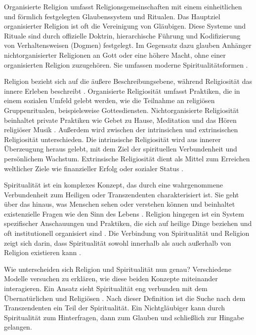 Organisierte Religion umfasst Religionsgemeinschaften mit einem einheitlichen und förmlich festgelegten Glaubenssystem und Ritualen. Das Hauptziel organisierter Religion ist oft die Vereinigung von Gläubigen. Diese Systeme und Rituale sind durch offizielle Doktrin, hierarchische Führung und Kodifizierung von Verhaltensweisen (Dogmen) festgelegt. 
Im Gegensatz dazu glauben Anhänger nichtorganisierter Religionen an Gott oder eine höhere Macht, ohne einer organisierten Religion zuzugehören. Sie umfassen moderne Spiritualitätsformen \parencite{OrgaRel}.

Religion bezieht sich auf die äußere Beschreibungsebene, während Religiosität das innere Erleben beschreibt \parencite{ReligionReligiosität}. Organisierte Religiosität umfasst Praktiken, die in einem sozialen Umfeld gelebt werden, wie die Teilnahme an religiösen Gruppenritualen, beispielsweise Gottesdiensten. Nichtorganisierte Religiosität beinhaltet private Praktiken wie Gebet zu Hause, Meditation und das Hören religiöser Musik \parencite{ReliSpiriModell, DUREL_Val}. 
Außerdem wird zwischen der intrinsichen und extrinsischen Religiosität unterschieden. Die intrinsische Religiosität wird aus innerer Überzeugung heraus gelebt, mit dem Ziel der spirituellen Verbundenheit und persönlichem Wachstum. Extrinsische Religiosität dient als Mittel zum Erreichen weltlicher Ziele wie finanzieller Erfolg oder sozialer Status \parencite{DUREL_Val}.

Spiritualität ist ein komplexes Konzept, das durch eine wahrgenommene Verbundenheit zum Heiligen oder Transzendenten charakterisiert ist. Sie geht über das hinaus, was Menschen sehen oder verstehen können und beinhaltet existenzielle Fragen wie den Sinn des Lebens \parencite{Spiritualität}. Religion hingegen ist ein System spezifischer Anschauungen und Praktiken, die sich auf heilige Dinge beziehen und oft institutionell organisiert sind \parencite{Durkeim1981}. Die Verbindung von Spiritualität und Religion zeigt sich darin, dass Spiritualität sowohl innerhalb als auch außerhalb von Religion existieren kann \parencite{Büssing2008}.

Wie unterscheiden sich Religion und Spiritualität nun genau? Verschiedene Modelle versuchen zu erklären, wie diese beiden Konzepte miteinander interagieren. Ein Ansatz sieht Spiritualität eng verbunden mit dem Übernatürlichen und Religiösen \parencite{Spiritualität}. Nach dieser Definition ist die Suche nach dem Transzendenten ein Teil der Spiritualität. Ein Nichtgläubiger kann durch Spiritualität zum Hinterfragen, dann zum Glauben und schließlich zur Hingabe gelangen.

